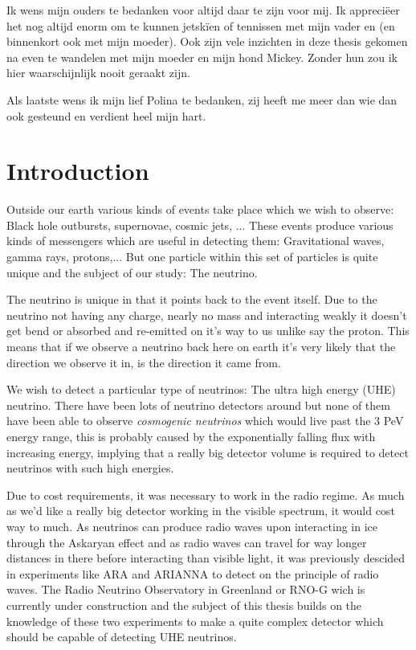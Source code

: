 \documentclass[11pt,a4paper,faculty=we,language=en,doctype=report]{cls/ugent-doc}
\begin{document}
Ik wens mijn ouders te bedanken voor altijd daar te zijn voor mij.
Ik appreciëer het nog altijd enorm om te kunnen jetskïen of
tennissen met mijn vader en (en binnenkort ook met mijn moeder).
Ook zijn vele inzichten in deze thesis gekomen na even te wandelen
met mijn moeder en mijn hond Mickey.  Zonder hun zou ik hier
waarschijnlijk nooit geraakt zijn.

Als laatste wens ik mijn lief Polina te bedanken, zij heeft me
meer dan wie dan ook gesteund en verdient heel mijn hart.
\newpage
{\hypersetup{hidelinks}\tableofcontents} %
\newpage


\chapter*{Introduction}
Outside our earth various kinds of events take place which we wish to 
observe: Black hole outbursts, supernovae, cosmic jets, ...
These events produce various kinds of messengers which are useful in
detecting them: Gravitational waves, gamma rays, protons,...
But one particle within this set of particles is quite unique and
the subject of our study: The neutrino. 

The neutrino is unique in that it points back to the event itself.
Due to the neutrino not having any charge, nearly no mass and 
interacting weakly it doesn't get bend or absorbed and re-emitted 
on it's way to us unlike say the proton. This means that if we observe
a neutrino back here on earth it's very likely that the direction we observe
it in, is the direction it came from.

We wish to detect a particular type of neutrinos: The ultra high energy (UHE)
neutrino.  There have been lots of neutrino detectors around but none of them
have been able to observe \textit{cosmogenic neutrinos} which would live past
the 3 PeV energy range, this is probably caused by the exponentially falling
flux with increasing energy, implying that a really big detector volume is
required to detect neutrinos with such high energies. 

Due to cost requirements, it was necessary to work in the radio regime.  As
much as we'd like a really big detector working in the visible spectrum, it
would cost way to much. As neutrinos can produce radio waves upon interacting
in ice through the Askaryan effect and as radio waves can travel for way longer
distances in there before interacting than visible light, it was previously
descided in experiments like ARA and ARIANNA to detect on the principle of
radio waves. The Radio Neutrino Observatory in Greenland or RNO-G wich is
currently under construction and the subject of this thesis builds on the
knowledge of these two experiments to make a quite complex detector which
should be capable of detecting UHE neutrinos.
\end{document}
